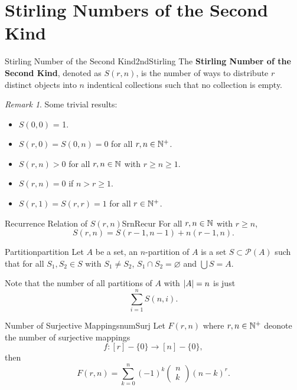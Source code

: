 \documentclass[math]{amznotes}
\theoremstyle{remark}
\newtheorem*{remark}{Remark}
\begin{document}
\section{Stirling Numbers of the Second Kind}
\begin{dfnbox}{Stirling Number of the Second Kind}{2ndStirling}
    The {\color{red} \textbf{Stirling Number of the Second Kind}}, denoted as $S(r, n)$, is the number of ways to distribute $r$ distinct objects into $n$ indentical collections such that no collection is empty.
\end{dfnbox}
\begin{notebox}
    \begin{remark}
        Some trivial results:
        \begin{itemize}
            \item $S(0, 0)$ = 1.
            \item $S(r, 0) = S(0, n) = 0$ for all $r, n \in \mathbb{N}^+$.
            \item $S(r, n) > 0$ for all $r, n \in \mathbb{N}$ with $r \geq n \geq 1$.
            \item $S(r, n) = 0$ if $n > r \geq 1$.
            \item $S(r, 1) = S(r, r) = 1$ for all $r \in \mathbb{N}^+$.
        \end{itemize}
    \end{remark}
\end{notebox}
\begin{thmbox}{Recurrence Relation of $S(r, n)$}{SrnRecur}
    For all $r, n \in \mathbb{N}$ with $r \geq n$,
    \begin{equation*}
        S(r, n) = S(r - 1, n - 1) + n(r - 1, n).
    \end{equation*}
\end{thmbox}
\begin{dfnbox}{Partition}{partition}
    Let $A$ be a set, an $n$-partition of $A$ is a set $S \subset \mathcal{P}(A)$ such that for all $S_1, S_2 \in S$ with $S_1 \neq S_2$, $S_1 \cap S_2 = \varnothing$ and $\bigcup S = A$.
\end{dfnbox}
Note that the number of all partitions of $A$ with ${\left\lvert {A} \right\rvert} = n$ is just
\begin{equation*}
    \sum_{i = 1}^{n}S(n, i).
\end{equation*}
\begin{thmbox}{Number of Surjective Mappings}{numSurj}
    Let $F(r, n)$ where $r, n \in \mathbb{N}^+$ deonote the number of surjective mappings
    \begin{equation*}
        f \colon [r] - \{0\} \to [n] - \{0\},
    \end{equation*}
    then
    \begin{equation*}
        F(r, n) = \sum_{k = 0}^{n}(-1)^k \begin{pmatrix}
            n \\
            k
        \end{pmatrix}(n - k)^r.
    \end{equation*}
\end{thmbox}
\end{document}
